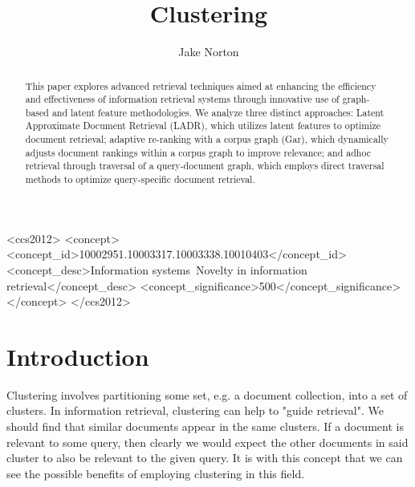 \documentclass[sigconf,authorversion,nonacm]{acmart}
\begin{document}
 \title{Clustering} \author{Jake Norton}  


    \begin{abstract} 
    This paper explores advanced retrieval techniques aimed at enhancing the efficiency and
    effectiveness of information retrieval systems through innovative use of graph-based and latent
    feature methodologies. We analyze three distinct approaches: Latent Approximate Document
    Retrieval (LADR), which utilizes latent features to optimize document retrieval; adaptive
    re-ranking with a corpus graph (Gar), which dynamically adjusts document rankings within a
    corpus graph to improve relevance; and adhoc retrieval through traversal of a query-document
    graph, which employs direct traversal methods to optimize query-specific document retrieval.
    \end{abstract}


\begin{CCSXML}
<ccs2012>
   <concept>
       <concept_id>10002951.10003317.10003338.10010403</concept_id>
       <concept_desc>Information systems~Novelty in information retrieval</concept_desc>
       <concept_significance>500</concept_significance>
       </concept>
 </ccs2012>
\end{CCSXML}



\maketitle
\section{Introduction} Clustering involves partitioning some set, e.g. a document collection, into a set of clusters. In
information retrieval, clustering can help to "guide retrieval"\cite{Yuan2022}. We should find that similar documents
appear in the same clusters. If a document is relevant to some query, then clearly we would expect the other documents
in said cluster to also be relevant to the given query. It is with this concept that we can see the possible benefits of
employing clustering in this field.
\end{document}
